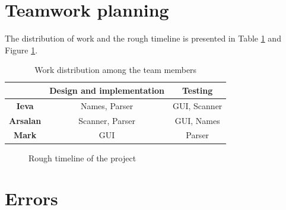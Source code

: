 \documentclass[12pt]{article}
\begin{document}
	
\section{Teamwork planning}

The distribution of work and the rough timeline is presented in Table \ref{teamwork} and Figure \ref{timeline}.

\begin{table}[H]
	\centering
	\begin{tabular}{ |c|c|c| }
		\hline
		                 & \textbf{Design and implementation} & \textbf{Testing} \\ \hline
		\textbf{Ieva}    &           Names, Parser            &   GUI, Scanner   \\ \hline
		\textbf{Arsalan} &          Scanner, Parser           &    GUI, Names    \\ \hline
		\textbf{Mark}    &                GUI                 &      Parser      \\ \hline
	\end{tabular}
	\captionsetup{justification=centering,labelfont=it,textfont=it,margin=1cm}
	\caption{Work distribution among the team members}
	\label{teamwork}
\end{table}

\begin{figure}[H]
	\centering
	\captionsetup{justification=centering,margin=2cm}
	\caption{Rough timeline of the project}
	\label{timeline}
\end{figure}




\section{Errors}
\end{document}
